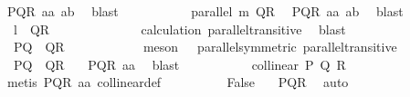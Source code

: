 \begin{isabellebody}
\ PQR\ a{}a\ a{}b\ \isamarkupfalse%
\ blast\isanewline
\ \ \ \ \ \ \ \ \isamarkupfalse%
\ {}{\isacharcolon}{\kern0pt}\ {\isachardoublequoteopen}parallel\ {\isacharquery}{\kern0pt}m\ {\isacharquery}{\kern0pt}QR{\isachardoublequoteclose}\ \isamarkupfalse%
\ PQR\ a{}a\ a{}b\ \isamarkupfalse%
\ blast\isanewline
\ \ \ \ \ \ \ \ \isamarkupfalse%
\ {}{\isacharcolon}{\kern0pt}\ {\isachardoublequoteopen}{\isacharquery}{\kern0pt}l\ {\isacharbar}{\kern0pt}{\isacharbar}{\kern0pt}\ {\isacharquery}{\kern0pt}QR{\isachardoublequoteclose}\ \isanewline
\ \ \ \ \ \ \ \ \ \ \isamarkupfalse%
\ {\isachardoublequoteopen}{}{\isachardoublequoteclose}\ calculation\ parallel{\isacharunderscore}{\kern0pt}transitive\ \isamarkupfalse%
\ blast\isanewline
\ \ \ \ \ \ \ \ \isamarkupfalse%
\ {}{\isacharcolon}{\kern0pt}\ {\isachardoublequoteopen}{\isacharquery}{\kern0pt}PQ\ {\isacharbar}{\kern0pt}{\isacharbar}{\kern0pt}\ {\isacharquery}{\kern0pt}QR{\isachardoublequoteclose}\isanewline
\ \ \ \ \ \ \ \ \ \ \isamarkupfalse%
\ {\isacharparenleft}{\kern0pt}meson\ {\isachardoublequoteopen}{}{\isachardoublequoteclose}\ {\isachardoublequoteopen}{}{\isachardoublequoteclose}\ parallel{\isacharunderscore}{\kern0pt}symmetric\ parallel{\isacharunderscore}{\kern0pt}transitive{}{\isacharparenright}{\kern0pt}\isanewline
\ \ \ \ \ \ \ \ \isamarkupfalse%
\ {}{\isacharcolon}{\kern0pt}\ {\isachardoublequoteopen}{\isacharquery}{\kern0pt}PQ\ {\isacharequal}{\kern0pt}\ {\isacharquery}{\kern0pt}QR{\isachardoublequoteclose}\ \isamarkupfalse%
\ {\isachardoublequoteopen}{}{\isachardoublequoteclose}\ PQR\ a{}a\ \isamarkupfalse%
\ blast\isanewline
\ \ \ \ \ \ \ \ \isamarkupfalse%
\ {}{\isacharcolon}{\kern0pt}\ {\isachardoublequoteopen}collinear\ P\ Q\ R{\isachardoublequoteclose}\ \isamarkupfalse%
\ {}\ \isamarkupfalse%
\ {\isacharparenleft}{\kern0pt}metis\ PQR\ a{}a\ collinear{\isacharunderscore}{\kern0pt}def{\isacharparenright}{\kern0pt}\isanewline
\ \ \ \ \ \ \ \ \isamarkupfalse%
\ False\ \isamarkupfalse%
\ {}\ PQR\ \isamarkupfalse%
\ auto\isanewline
\ \ \ \ \ \ \isamarkupfalse%

\end{isabellebody}
